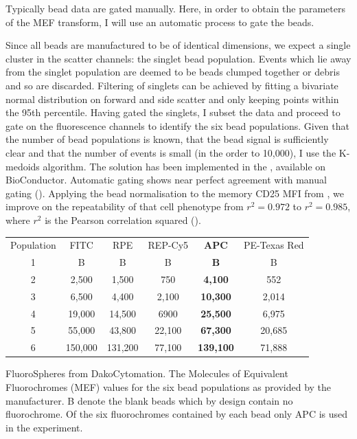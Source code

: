 Typically bead data are gated manually.
Here, in order to obtain the parameters of the MEF transform, I will use an automatic process to gate the beads.

Since all beads are manufactured to be of identical dimensions, we expect a single cluster in the scatter channels: the singlet bead population.
Events which lie away from the singlet population are deemed to be beads clumped together or debris and so are discarded.
Filtering of singlets can be achieved by fitting a bivariate normal distribution on forward and side scatter and only keeping
points within the 95th percentile.
Having gated the singlets, I subset the data and proceed to gate on the fluorescence channels to identify the six bead populations.
Given that the number of bead populations is known, that the bead signal is sufficiently clear and that the number of events is small (in the order to 10,000),
I use the K-medoids algorithm.
The solution has been implemented in the , available on BioConductor.
Automatic gating shows near perfect agreement with manual gating ().
Applying the bead normalisation to the memory CD25 MFI from , we improve on the repeatability of that 
cell phenotype from $r^2=0.972$ to $r^2=0.985$, where $r^2$ is the Pearson correlation squared ().

\begin{table} [hb]
\begin{center}
\begin{tabular} {|c c c c c c|}
\cline{1-6}
Population  & FITC    & RPE     & REP-Cy5 & \textbf{APC}     & PE-Texas Red\\
\cline{1-6}
1           & B       & B       & B       & \textbf{B}       & B \\
2           & 2,500   & 1,500   & 750     & \textbf{4,100}   & 552\\
3           & 6,500   & 4,400   & 2,100   & \textbf{10,300}  & 2,014\\
4           & 19,000  & 14,500  & 6900    & \textbf{25,500}  & 6,975\\
5           & 55,000  & 43,800  & 22,100  & \textbf{67,300}  & 20,685\\
6           & 150,000 & 131,200 & 77,100  & \textbf{139,100} & 71,888\\
\cline{1-6}
\end{tabular}
\end{center}
{FluoroSpheres from DakoCytomation.}
{
The Molecules of Equivalent Fluorochromes (MEF) values for the six bead populations as provided by the manufacturer.
B denote the blank beads which by design contain no fluorochrome.
Of the six fluorochromes contained by each bead only APC is used in the experiment.
}
\end{table}

